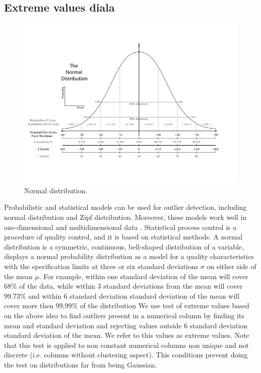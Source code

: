 \documentclass{article}
\begin{document}
\subsection{Extreme values diala} %
\label{sub:Extreme values}
\begin{figure}[H]
    \centering
    \includegraphics[width=0.8\linewidth]{picture/normal.png}
    \caption{Normal distribution.}
    \label{fig:normal}
\end{figure}
Probabilistic and statistical models can be used for outlier detection, including normal distribution and Zipf distribution. Moreover, these models work well in one-dimensional and
multidimensional data \cite{dai_yosh_pars}.
Statistical process control is a procedure of quality control, and it is based on statistical methods.
A normal distribution is a symmetric, continuous, bell-shaped distribution of a variable, displays a normal probability distribution as a model for a quality characteristics with the specification limits at three or six standard deviations $\sigma$ on either side of the mean $\mu$.
For example, within one standard deviation of the mean will cover 68\% of the data, while within 3 standard deviations from the mean will cover 99.73\% and within 6 standard deviation standard deviation of the mean will cover more then 99,99\% of the distribution
We use test of extreme values based on the above idea to find outliers present in a numerical column by finding its mean and standard deviation and rejecting values outside 6 standard deviation standard deviation of the mean.
We refer to this values as extreme values. Note that this test is applied to non constant numerical columns non unique and not discrete (i.e. columns without clustering aspect). This conditions prevent doing the test on distributions far from being Gaussian.
\end{document}
